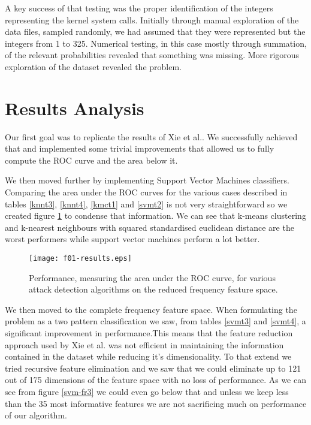 \documentclass[reqno,openany,12pt]{amsbook}
\begin{document}
A key success of that testing was the proper identification of the integers representing the kernel system calls. Initially through manual exploration of the data files, sampled randomly, we had assumed that they were represented but the integers from 1 to 325. Numerical testing, in this case mostly through summation, of the relevant probabilities revealed that something was missing. More rigorous exploration of the dataset revealed the problem.

\section{Results Analysis}

Our first goal was to replicate the results of Xie et al.\cite{out1}. We successfully achieved that and implemented some trivial improvements that allowed us to fully compute the ROC curve and the area below it. 

We then moved further by implementing Support Vector Machines classifiers. Comparing the area under the ROC curves for the various cases described in tables \ref{knnt3}, \ref{knnt4}, \ref{kmct1} and \ref{svmt2} is not very straightforward so we created figure \ref{res1} to condense that information. We can see that k-means clustering and k-nearest neighbours with squared standardised euclidean distance are the worst performers while support vector machines perform a lot better.
\begin{figure}[hbt]
\texttt{[image: f01-results.eps]}
\caption[Performance on reduced frequency feature space.]{Performance, measuring the area under the ROC curve, for various attack detection algorithms on the reduced frequency feature space.}
\label{res1}
\end{figure}

We then moved to the complete frequency feature space. When formulating the problem as a two pattern classification we saw, from tables \ref{svmt3} and \ref{svmt4}, a significant improvement in performance.This means that the feature reduction approach used by Xie et al.\cite{out1} was not efficient in maintaining the information contained in the dataset while reducing it's dimensionality. To that extend we tried recursive feature elimination and we saw that we could eliminate up to 121 out of 175 dimensions of the feature space with no loss of performance.
As we can see from figure \ref{svm-fr3} we could even go below that and unless we keep less than the 35 most informative features we are not sacrificing much on performance of our algorithm.
\end{document}
